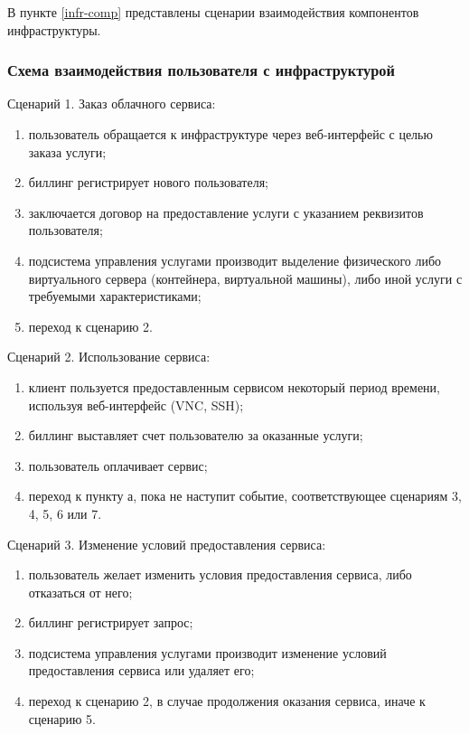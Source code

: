 В пункте \ref{infr-comp} представлены сценарии взаимодействия компонентов инфраструктуры.

\subsubsection{Схема взаимодействия пользователя с инфраструктурой} \label{user-infr}

Сценарий 1. Заказ облачного сервиса:
\begin{enumerate}
  \item пользователь обращается к инфраструктуре через веб-интерфейс с целью заказа услуги;
  \item биллинг регистрирует нового пользователя;
  \item заключается договор на предоставление услуги с указанием реквизитов пользователя;
  \item подсистема управления услугами производит выделение физического либо виртуального сервера (контейнера, виртуальной машины), либо иной услуги с требуемыми характеристиками;
  \item переход к сценарию 2.
\end{enumerate}

Сценарий 2. Использование сервиса:
\begin{enumerate}
  \item клиент пользуется предоставленным сервисом некоторый период времени, используя веб-интерфейс (VNC, SSH);
  \item биллинг выставляет счет пользователю за оказанные услуги;
  \item пользователь оплачивает сервис;
  \item переход к пункту а, пока не наступит событие, соответствующее сценариям 3, 4, 5, 6 или 7.
\end{enumerate}

Сценарий 3. Изменение условий предоставления сервиса:
\begin{enumerate}
  \item пользователь желает изменить условия предоставления сервиса, либо отказаться от него;
  \item биллинг регистрирует запрос;
  \item подсистема управления услугами производит изменение условий предоставления сервиса или удаляет его;
  \item переход к сценарию 2, в случае продолжения оказания сервиса, иначе к сценарию 5.
\end{enumerate}

